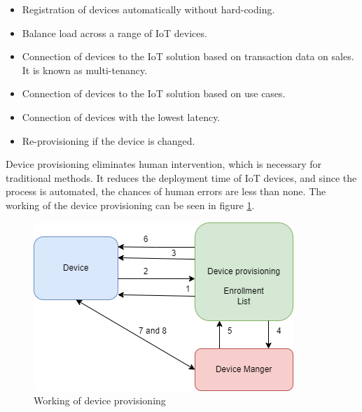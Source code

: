 \documentclass[12pt,a4paper]{article}
\begin{document}
{\begin{itemize}
\item Registration of devices automatically without hard-coding. \cite{r36}
\item Balance load across a range of IoT devices.\cite{r36}
\item Connection of devices to the IoT solution based on transaction data on sales. It is known as multi-tenancy. \cite{r36}
\item Connection of devices to the IoT solution based on use cases. \cite{r36} 
\item Connection of devices with the lowest latency. \cite{r36}
\item Re-provisioning if the device is changed. \cite{r36}
\end{itemize}

Device provisioning eliminates human intervention, which is necessary for traditional methods. It reduces the deployment time of IoT devices, and since the process is automated, the chances of human errors are less than none. The working of the device provisioning can be seen in figure \ref{device_provisioning}.


\begin{figure}
\centering
\includegraphics[scale=1 ]{device_provisioning.png}
\caption{Working of device provisioning}
\label{device_provisioning}
\end{figure}

\begin{enumerate}



\end{enumerate}}
\end{document}

